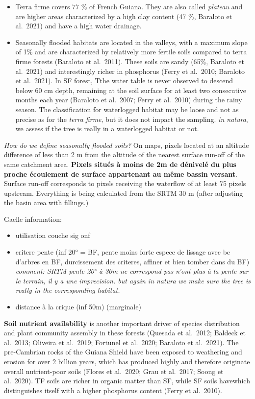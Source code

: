 \documentclass[
]{book}
\providecommand{\tightlist}{%
  \setlength{\itemsep}{0pt}\setlength{\parskip}{0pt}}
\begin{document}
\begin{itemize}
\item
  Terra firme covers 77 \% of French Guiana. They are also called \emph{plateau} and are higher areas characterized by a high clay content (47 \%, Baraloto et al.~2021) and have a high water drainage.
\item
  Seasonally flooded habitats are located in the valleys, with a maximum slope of 1\% and are characterized by relatively more fertile soils compared to terra firme forests (Baraloto et al.~2011). These soils are sandy (65\%, Baraloto et al.~2021) and interestingly richer in phosphorus (Ferry et al.~2010; Baraloto et al.~2021). In SF forest, Tthe water table is never observed to descend below 60 cm depth, remaining at the soil surface for at least two consecutive months each year (Baraloto et al.~2007; Ferry et al.~2010) during the rainy season. The classification for waterlogged habitat may be loose and not as precise as for the \emph{terra firme}, but it does not impact the sampling. \emph{in natura}, we assess if the tree is really in a waterlogged habitat or not.
\end{itemize}

\emph{How do we define seasonally flooded soils?} On maps, pixels located at an altitude difference of less than 2 m from the altitude of the nearest surface run-off of the same catchment area. \textbf{Pixels situés à moins de 2m de dénivelé du plus proche écoulement de surface appartenant au même bassin versant}. Surface run-off corresponds to pixels receiving the waterflow of at least 75 pixels upstream. Everything is being calculated from the SRTM 30 m (after adjusting the basin area with fillings.)

Gaelle information:

\begin{itemize}
\tightlist
\item
  utilisation couche sig onf
\item
  critere pente (inf 20° = BF, pente moins forte espece de lissage avec bc d'arbres en BF, durcissement des criteres, affiner et bien tomber dans du BF) \emph{comment: SRTM pente 20° à 30m ne correspond pas n'ont plus à la pente sur le terrain, il y a une imprecision. but again in natura we make sure the tree is really in the corresponding habitat.}
\item
  distance à la crique (inf 50m) (marginale)
\end{itemize}

\textbf{Soil nutrient availability} is another important driver of species distribution and plant community assembly in these forests (Quesada et al.~2012; Baldeck et al.~2013; Oliveira et al.~2019; Fortunel et al.~2020; Baraloto et al.~2021). The pre-Cambrian rocks of the Guiana Shield have been exposed to weathering and erosion for over 2 billion years, which has produced highly and therefore originate overall nutrient-poor soils (Flores et al.~2020; Grau et al.~2017; Soong et al.~2020). TF soils are richer in organic matter than SF, while SF soils havewhich distinguishes itself with a higher phosphorus content (Ferry et al.~2010).
\end{document}
